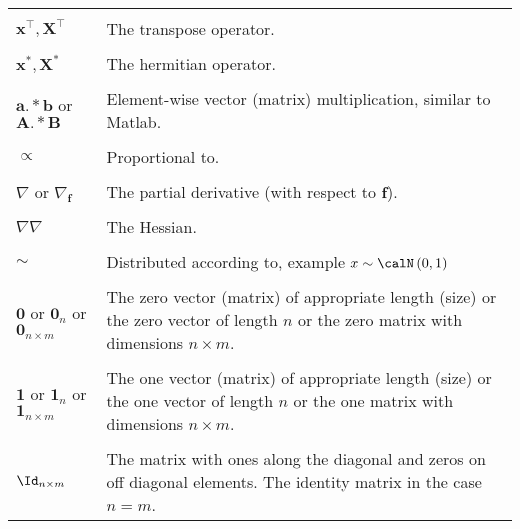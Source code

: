 \begin{longtable}{lp{}}
    \\\\
    $\bm{x}^{\intercal}, \bm{X}^{\intercal}$                                                                   & The transpose operator.
    \\\\
    $\bm{x}^{\ast}, \bm{X}^{\ast}$                                                                             & The hermitian operator.
    \\\\
    $\bm{a} .\ast \bm{b}$ or $\bm{A} .\ast \bm{B}$                                                             & Element-wise vector (matrix) multiplication, similar to Matlab.
    \\\\
    $\propto$                                                                                                  & Proportional to.
    \\\\
    $\nabla$ or $\nabla_{\bm{f}}$                                                                              & The partial derivative (with respect to $\bm{f}$).
    \\\\
    $\nabla \nabla$                                                                                            & The Hessian.
    \\\\
    $\sim$                                                                                                     & Distributed according to, example $x \sim \calN \left( 0,1 \right)$
    \\\\
    $\bm{0}$ or $\bm{0}_{n}$ or $\bm{0}_{n \times m}$                                                          & The zero vector (matrix) of appropriate length (size) or the zero vector of length $n$ or the zero matrix with dimensions $n \times m$.
    \\\\
    $\bm{1}$ or $\bm{1}_{n}$ or $\bm{1}_{n \times m}$                                                          & The one vector (matrix) of appropriate length (size) or the one vector of length $n$ or the one matrix with dimensions $n \times m$.
    \\\\
    $\Id_{n \times m}$                                                                                         & The matrix with ones along the diagonal and zeros on off diagonal elements. The identity matrix in the case $n=m$.

\end{longtable}
